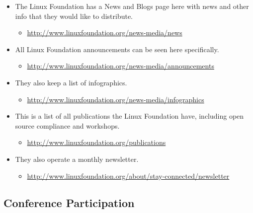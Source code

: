 \begin{itemize}
\itemsep1pt\parskip0pt
\item
  The Linux Foundation has a News and Blogs page here with news and
  other info that they would like to distribute.

  \begin{itemize}
  \itemsep1pt\parskip0pt
  \item
    \url{http://www.linuxfoundation.org/news-media/news}
  \end{itemize}
\item
  All Linux Foundation announcements can be seen here specifically.

  \begin{itemize}
  \itemsep1pt\parskip0pt
  \item
    \url{http://www.linuxfoundation.org/news-media/announcements}
  \end{itemize}
\item
  They also keep a list of infographics.

  \begin{itemize}
  \itemsep1pt\parskip0pt
  \item
    \url{http://www.linuxfoundation.org/news-media/infographics}
  \end{itemize}
\item
  This is a list of all publications the Linux Foundation have,
  including open source compliance and workshops.

  \begin{itemize}
  \itemsep1pt\parskip0pt
  \item
    \url{http://www.linuxfoundation.org/publications}
  \end{itemize}
\item
  They also operate a monthly newsletter.

  \begin{itemize}
  \itemsep1pt\parskip0pt
  \item
    \url{http://www.linuxfoundation.org/about/stay-connected/newsletter}
  \end{itemize}
\end{itemize}

\subsection{Conference Participation}\label{conference-participation}

